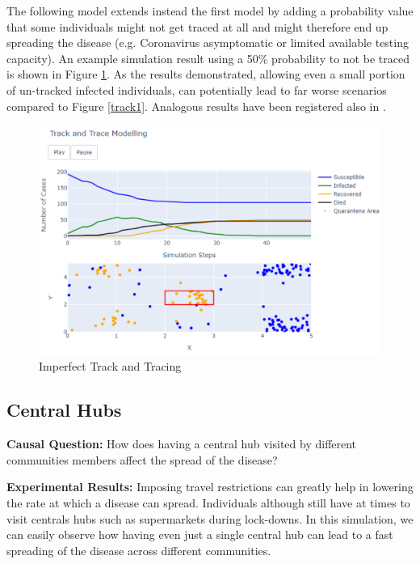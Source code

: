 The following model extends instead the first model by adding a probability value that some individuals might not get traced at all and might therefore end up spreading the disease (e.g. Coronavirus asymptomatic or limited available testing capacity). An example simulation result using a 50\% probability to not be traced is shown in Figure \ref{track2}. As the results demonstrated, allowing even a small portion of un-tracked infected individuals, can potentially lead to far worse scenarios compared to Figure \ref{track1}. Analogous results have been registered also in \cite{epic}.

\vspace{-0.4cm}
\begin{figure}[ht!]%
    \centering
    \includegraphics[width=0.85\linewidth]{latex/images/track2.pdf}
    \vspace{-0.4cm}
    \caption{Imperfect Track and Tracing}
    \label{track2}
\end{figure}
\vspace{-0.3cm}

\subsection{Central Hubs}

\textbf{Causal Question:} How does having a central hub visited by different communities members affect the spread of the disease?

\textbf{Experimental Results:} Imposing travel restrictions can greatly help in lowering the rate at which a disease can spread. Individuals although still have at times to visit centrals hubs such as supermarkets during lock-downs. In this simulation, we can easily observe how having even just a single central hub can lead to a fast spreading of the disease across different communities.

